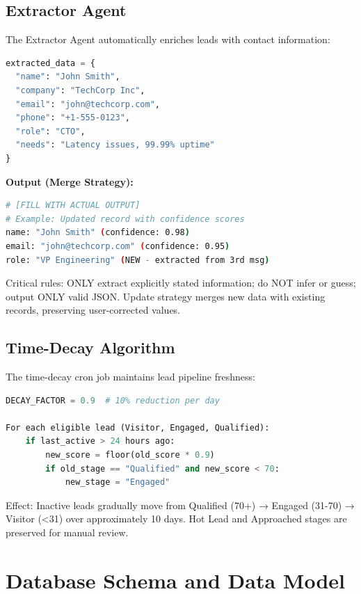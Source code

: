 \documentclass[10pt,twocolumn,a4paper]{article}
\begin{document}
\subsection{Extractor Agent}

The Extractor Agent automatically enriches leads with contact information:

\begin{lstlisting}[language=Python]
extracted_data = {
  "name": "John Smith",
  "company": "TechCorp Inc",
  "email": "john@techcorp.com",
  "phone": "+1-555-0123",
  "role": "CTO",
  "needs": "Latency issues, 99.99% uptime"
}
\end{lstlisting}

\textbf{Output (Merge Strategy):}
\begin{lstlisting}[language=bash]
# [FILL WITH ACTUAL OUTPUT]
# Example: Updated record with confidence scores
name: "John Smith" (confidence: 0.98)
email: "john@techcorp.com" (confidence: 0.95)
role: "VP Engineering" (NEW - extracted from 3rd msg)
\end{lstlisting}

Critical rules: ONLY extract explicitly stated information; do NOT infer or guess; output ONLY valid JSON. Update strategy merges new data with existing records, preserving user-corrected values.

\subsection{Time-Decay Algorithm}

The time-decay cron job maintains lead pipeline freshness:

\begin{lstlisting}[language=Python]
DECAY_FACTOR = 0.9  # 10% reduction per day

For each eligible lead (Visitor, Engaged, Qualified):
    if last_active > 24 hours ago:
        new_score = floor(old_score * 0.9)
        if old_stage == "Qualified" and new_score < 70:
            new_stage = "Engaged"
\end{lstlisting}

Effect: Inactive leads gradually move from Qualified (70+) → Engaged (31-70) → Visitor (<31) over approximately 10 days. Hot Lead and Approached stages are preserved for manual review.


\section{Database Schema and Data Model}
\end{document}
